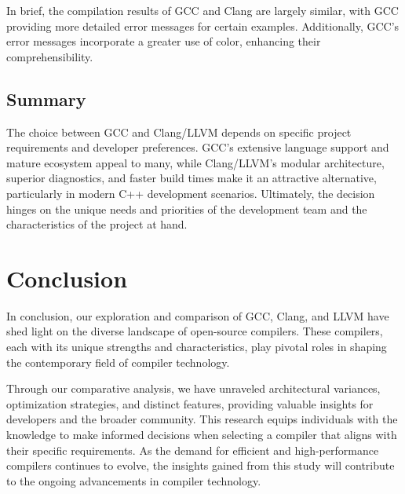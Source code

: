 \documentclass[conference]{IEEEtran}
\begin{document}
In brief, the compilation results of GCC and Clang are largely similar, with GCC providing more detailed error messages for certain examples. Additionally, GCC's error messages incorporate a greater use of color, enhancing their comprehensibility.

\subsection{Summary}

The choice between GCC and Clang/LLVM depends on specific project requirements and developer preferences. GCC's extensive language support and mature ecosystem appeal to many, while Clang/LLVM's modular architecture, superior diagnostics, and faster build times make it an attractive alternative, particularly in modern C++ development scenarios. Ultimately, the decision hinges on the unique needs and priorities of the development team and the characteristics of the project at hand.

\section{Conclusion}

In conclusion, our exploration and comparison of GCC, Clang, and LLVM have shed light on the diverse landscape of open-source compilers. These compilers, each with its unique strengths and characteristics, play pivotal roles in shaping the contemporary field of compiler technology.

Through our comparative analysis, we have unraveled architectural variances, optimization strategies, and distinct features, providing valuable insights for developers and the broader community. This research equips individuals with the knowledge to make informed decisions when selecting a compiler that aligns with their specific requirements. As the demand for efficient and high-performance compilers continues to evolve, the insights gained from this study will contribute to the ongoing advancements in compiler technology.
\end{document}
